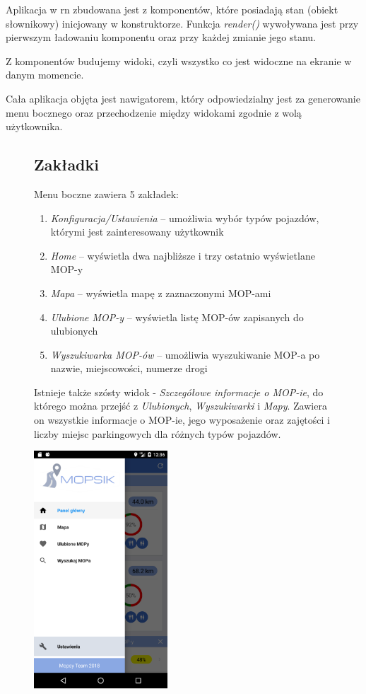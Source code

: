 Aplikacja w \acrshort{rn} zbudowana jest z komponentów, które posiadają stan (obiekt słownikowy) inicjowany w konstruktorze. Funkcja \textit{render()} wywoływana jest przy pierwszym ładowaniu komponentu oraz przy każdej zmianie jego stanu. 

Z komponentów budujemy widoki, czyli wszystko co jest widoczne na ekranie w danym momencie.

Cała aplikacja objęta jest nawigatorem, który odpowiedzialny jest za generowanie menu bocznego oraz przechodzenie między widokami zgodnie z wolą użytkownika. \\

\begin{figure}[!htb]
\centering
\begin{minipage}{.6\textwidth}
\subsection{Zakładki}
Menu boczne zawiera 5 zakładek: 
\begin{enumerate}
\item \textit{Konfiguracja/Ustawienia} -- umożliwia wybór typów pojazdów, którymi jest zainteresowany użytkownik
\item \textit{Home} -- wyświetla dwa najbliższe i trzy ostatnio wyświetlane MOP-y
\item \textit{Mapa} -- wyświetla mapę z zaznaczonymi MOP-ami
\item \textit{Ulubione MOP-y} -- wyświetla listę MOP-ów zapisanych do ulubionych
\item \textit{Wyszukiwarka MOP-ów} -- umożliwia wyszukiwanie MOP-a po nazwie, miejscowości, numerze drogi
\end{enumerate}
Istnieje także szósty widok - \textit{Szczegółowe informacje o MOP-ie}, do którego można przejść z \textit{Ulubionych}, \textit{Wyszukiwarki} i \textit{Mapy}. Zawiera on wszystkie informacje o MOP-ie, jego wyposażenie oraz zajętości i liczby miejsc parkingowych dla różnych typów pojazdów.
\end{minipage}%
\begin{minipage}{.4\textwidth}
  \centering
  \includegraphics[width=5cm]{images/mopsik_mobile/menu.png}
  \label{mopsik_menu}
\end{minipage}
\end{figure}



